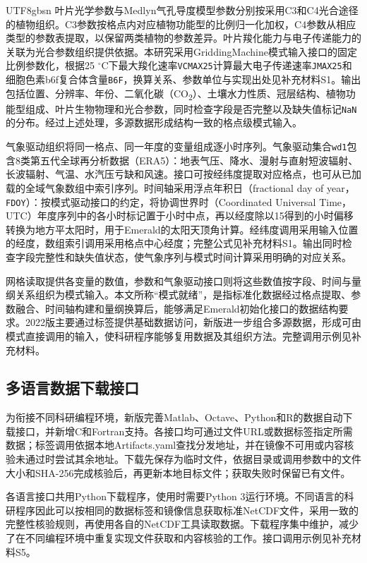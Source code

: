 \documentclass[numdoi]{chinese}
\begin{document}
\begin{CJK}{UTF8}{gbsn}
叶片光学参数与Medlyn气孔导度模型参数分别按采用C3和C4光合途径的植物组织\cite{ref6,ref7}。C3参数按格点内对应植物功能型的比例归一化加权，C4参数从相应类型的参数表提取，以保留两类植物的参数差异。叶片羧化能力与电子传递能力的关联为光合参数组织提供依据\cite{ref8}。本研究采用GriddingMachine模式输入接口的固定比例参数化，根据25 \ensuremath{{}^{\circ}\mathrm{C}}下最大羧化速率\nolinkurl{VCMAX25}计算最大电子传递速率\nolinkurl{JMAX25}和细胞色素b6f复合体含量\nolinkurl{B6F}，换算关系、参数单位与实现出处见补充材料S1。输出包括位置、分辨率、年份、二氧化碳（CO\textsubscript{2}）、土壤水力性质、冠层结构、植物功能型组成、叶片生物物理和光合参数，同时检查字段是否完整以及缺失值标记\nolinkurl{NaN}的分布。经过上述处理，多源数据形成结构一致的格点级模式输入。

气象驱动组织将同一格点、同一年度的变量组成逐小时序列。气象驱动集合\nolinkurl{wd1}包含8类第五代全球再分析数据（ERA5）\cite{ref9}：地表气压、降水、漫射与直射短波辐射、长波辐射、气温、水汽压亏缺和风速。接口可按经纬度提取对应格点，也可从已加载的全域气象数组中索引序列。时间轴采用浮点年积日（fractional day of year，\nolinkurl{FDOY}）：按模式驱动接口的约定，将协调世界时（Coordinated Universal Time，UTC）年度序列中的各小时标记置于小时中点，再以经度除以15得到的小时偏移转换为地方平太阳时，用于Emerald的太阳天顶角计算。经纬度调用采用输入位置的经度，数组索引调用采用格点中心经度；完整公式见补充材料S1。输出同时检查字段完整性和缺失值状态，使气象序列与模式时间计算采用明确的对应关系。

网格读取提供各变量的数值，参数和气象驱动接口则将这些数值按字段、时间与量纲关系组织为模式输入。本文所称“模式就绪”，是指标准化数据经过格点提取、参数融合、时间轴构建和量纲换算后，能够满足Emerald初始化接口的数据结构要求。2022版主要通过标签提供基础数据访问\cite{ref5}，新版进一步组合多源数据，形成可由模式直接调用的输入，使科研程序能够复用数据及其组织方法。完整调用示例见补充材料。

\subsection{多语言数据下载接口}
为衔接不同科研编程环境，新版完善Matlab、Octave、Python和R的数据自动下载接口，并新增C和Fortran支持。各接口均可通过文件URL或数据标签指定所需数据；标签调用依据本地Artifacts.yaml查找分发地址，并在镜像不可用或内容核验未通过时尝试其余地址。下载先保存为临时文件，依据目录或调用参数中的文件大小和SHA-256完成核验后，再更新本地目标文件；获取失败时保留已有文件。

各语言接口共用Python下载程序，使用时需要Python 3运行环境。不同语言的科研程序因此可以按相同的数据标签和镜像信息获取标准NetCDF文件，采用一致的完整性核验规则，再使用各自的NetCDF工具读取数据。下载程序集中维护，减少了在不同编程环境中重复实现文件获取和内容核验的工作。接口调用示例见补充材料S5。


\end{CJK}
\end{document}
